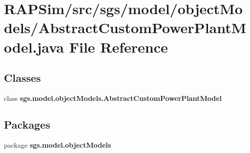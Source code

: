\section{R\-A\-P\-Sim/src/sgs/model/object\-Models/\-Abstract\-Custom\-Power\-Plant\-Model.java File Reference}
\label{_abstract_custom_power_plant_model_8java}
\subsection*{Classes}
\begin{DoxyCompactItemize}
\item 
class {\bf sgs.\-model.\-object\-Models.\-Abstract\-Custom\-Power\-Plant\-Model}
\end{DoxyCompactItemize}
\subsection*{Packages}
\begin{DoxyCompactItemize}
\item 
package {\bf sgs.\-model.\-object\-Models}
\end{DoxyCompactItemize}
